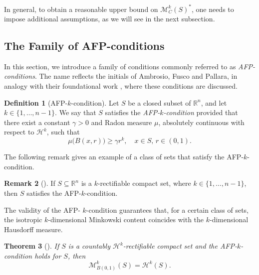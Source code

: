 \documentclass[pdflatex,sn-mathphys-num]{sn-jnl}
\theoremstyle{plain}
\newtheorem{theorem}{Theorem}[section]
\theoremstyle{definition}
\newtheorem{definition}[theorem]{Definition}
\newtheorem{rem}[theorem]{Remark}
\begin{document}
In general, to obtain a reasonable upper bound on $\mathcal{M}^k_C(S)^*$, one needs to impose additional assumptions, as we will see in the next subsection.

\subsection{The Family of AFP-conditions}
\label{SecDef}
In this section, we introduce a family of conditions commonly referred to as \emph{AFP-conditions}. The name reflects the initials of Ambrosio, Fusco and Pallara, in analogy with their foundational work \cite[p.~110]{ambrosio}, where these conditions are discussed.
\begin{definition}[AFP-$k$-condition]
    Let $S$ be a closed subset of $\mathbb{R}^n$, and let $k\in\{1, \dots, n-1\}.$ We say that $S$ satisfies the \emph{AFP-$k$-condition} provided that there exist a constant $\gamma>0$ and Radon measure $\mu$, absolutely continuous with respect to $\mathcal{H}^k$, such that \begin{equation}\label{pp21}
        \mu\big(B(x, r)\big)\geq\gamma r^{k},\quad\text{$x\in S$, $r\in(0, 1)$.}
    \end{equation}
\end{definition}
The following remark gives an example of a class of sets that satisfy the AFP-$k$-condition.
\begin{rem}[]\label{rema}
    If $S\subseteq\mathbb{R}^n$ is a $k$-rectifiable compact set, where $k\in\{1, \dots, n-1\}$, then $S$ satisfies the AFP-$k$-condition.
\end{rem}

The validity of the AFP-
$k$-condition guarantees that, for a certain class of sets, the isotropic 
$k$-dimensional Minkowski content coincides with the 
$k$-dimensional Hausdorff measure.


\begin{theorem}[]\label{pp14}
    If $S$ is a countably $\mathcal{H}^k$-rectifiable compact set and the AFP-$k$-condition holds for $S$, then $$\mathcal{M}^k_{B(0, 1)}(S)=\mathcal{H}^k(S).$$
\end{theorem}
\end{document}
